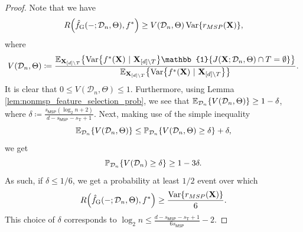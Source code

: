 \documentclass[11pt]{article}
\newcommand{\bX}{\mathbf{X}}
\DeclarePairedDelimiter{\braces}{\lbrace}{\rbrace}
\DeclarePairedDelimiter{\paren}{(}{)}
\renewcommand{\P}{\mathbb{P}}
\newcommand{\E}{\mathbb{E}}
\newcommand{\indicator}{\mathbb{1}}
\newcommand{\Var}{\operatorname{Var}}
\newcommand{\sparsity}{s}
\newcommand{\nfeats}{d}
\newcommand{\nsamples}{n}
\newcommand{\coordindices}{[\nfeats]}
\newcommand{\data}[1][n]{\mathcal{D}_{#1}}
\newcommand{\MSP}{\textsf{MSP}}
\newcommand{\fgreedy}{\hat{f}_{\operatorname{G}}}
\newcommand{\traversal}{T}
\newcommand{\traversalsize}{\sparsity_{\operatorname{T}}}
\begin{document}
\begin{proof}
    Note that we have
    \begin{equation}
        R\paren*{\fgreedy(-;\data,\Theta),f^*} \geq V(\data,\Theta)\Var\braces*{r_{\MSP}(\bX)},
    \end{equation}
    where
    \begin{equation}
        V(\data,\Theta) \coloneqq \frac{\E_{\bX_{\coordindices\backslash\traversal}}\braces*{\Var\braces*{f^*(\bX)~|~\bX_{\coordindices\backslash\traversal}}\indicator\braces*{J(\bX;\data,\Theta)\cap\traversal = \emptyset}}}{\E_{\bX_{\coordindices\backslash\traversal}}\braces*{\Var\braces*{f^*(\bX)~|~\bX_{\coordindices\backslash\traversal}}}}.
    \end{equation}
    It is clear that $0 \leq V(\data,\Theta) \leq 1$.
    Furthermore, using Lemma \ref{lem:nonmsp_feature_selection_prob}, we see that $\E_{\data}\braces*{V(\data,\Theta)} \geq 1 - \delta$, where $\delta \coloneqq \frac{s_{\MSP}(\log_2\nsamples+2)}{\nfeats - s_{\MSP} - \traversalsize+1}$.
    Next, making use of the simple inequality
    \begin{equation}
        \E_{\data}\braces*{V(\data,\Theta)} \leq \P_{\data}\braces*{V(\data,\Theta) \geq \delta} + \delta,
    \end{equation}
    we get
    \begin{equation}
        \P_{\data}\braces*{V(\data) \geq \delta} \geq 1 - 3\delta.
    \end{equation}
    As such, if $\delta \leq 1/6$, we get a probability at least $1/2$ event over which
    \begin{equation}
        R\paren*{\fgreedy(-;\data,\Theta),f^*} \geq \frac{\Var\braces*{r_{\MSP}(\bX)}}{6}.
    \end{equation}
    This choice of $\delta$ corresponds to $\log_2\nsamples \leq \frac{\nfeats-s_{\MSP}-\traversalsize+1}{6s_{\MSP}} - 2$.
    

\end{proof}
\end{document}
